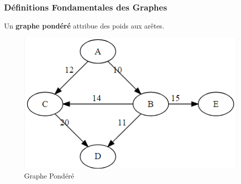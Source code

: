 \begin{frame}
\frametitle{Définitions Fondamentales des Graphes}

\begin{tcolorbox}[colback=orange!10,colframe=orange!100!black,
    title=Graphe Pondéré]
Un \textbf{graphe pondéré} attribue des poids aux arêtes.
\end{tcolorbox}

\begin{figure}[H]
    \centering
    \includegraphics[width=0.5 \textwidth]{Figures/GraphePondere.PNG}
    \caption{Graphe Pondéré}
    \label{fig:Graphe Pondéré}
\end{figure}

\end{frame}
